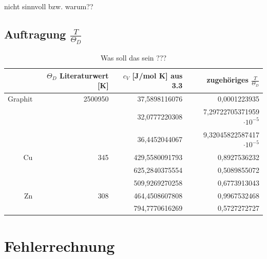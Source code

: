 \documentclass[12pt,a4paper,titlepage,headinclude,bibtotoc]{scrartcl}
\begin{document}
nicht sinnvoll bzw. warum??

\subsection{Auftragung $\frac{T}{\Theta_D}$}


\begin{table} [h]
\centering
\caption{Was soll das sein ???}
\begin{tabular} {r | r |r | r }
&$\Theta_D$ Literaturwert [K] &$c_V$ [J/mol K] aus 3.3& zugehöriges $\frac{T}{\Theta_D}$ \\
\hline
Graphit& 2500950\protect\footnotemark &37,5898116076&0,0001223935 \\
&&32,0777220308& 7,29722705371959 $\cdot 10^{-5}$\\
&&36,4452044067& 9,32045822587417 $\cdot 10^{-5}$\\
Cu&345\protect\footnotemark &429,5580091793& 0,8927536232 \\
&&625,2840375554& 0,5089855072\\
&&509,9269270258& 0,6773913043\\
Zn&308\protect\footnotemark &464,4508607808& 0,9967532468\\
&&794,7770616269& 0,5727272727\\
\end{tabular}
\end{table}













\section{Fehlerrechnung}
\end{document}
